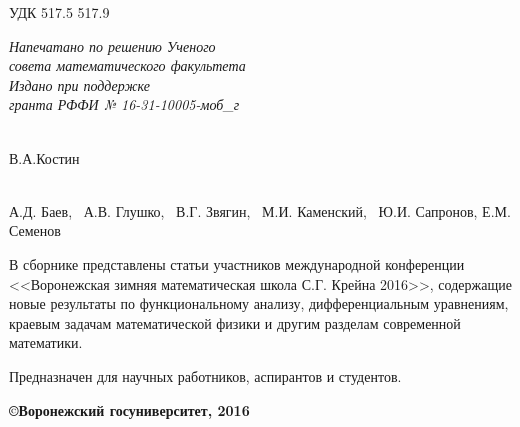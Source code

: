 \noindent УДК 517.5 517.9

\begin{flushright}
{\it Напечатано по решению Ученого \\ совета математического
факультета \\
\vspace{5mm} Издано при поддержке \\
гранта РФФИ № 16-31-10005-моб\_г }
 \end{flushright}
\vspace{15mm}{\bf Материалы работы международной конференции <<Воронежская зимняя математическая школа С.Г. Крейна - 2016>>. Воронеж: ВГУ, 2016 -  с.}

\vspace{5mm}

 \\
В.А.Костин

\vspace{5mm}

 \\
А.Д. Баев, \  А.В. Глушко, \ В.Г. Звягин, \ М.И. Каменский, \ Ю.И. Сапронов, Е.М. Семенов

\vspace{5mm}

В сборнике представлены статьи участников международной конференции <<Воронежская зимняя математическая школа С.Г. Крейна 2016>>, содержащие новые
результаты по функциональному анализу, дифференциальным уравнениям,
краевым задачам математической физики и другим разделам современной
математики.

Предназначен для научных работников, аспирантов и студентов. \\

\vspace{5mm}

\begin{flushright}
{\bf \copyright Воронежский госуниверситет, 2016}
\end{flushright}

\newpage
